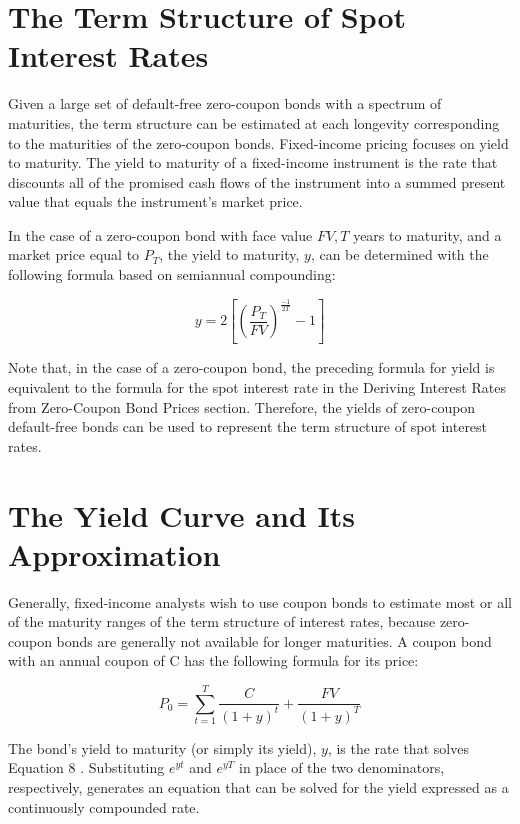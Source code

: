 \documentclass[11pt]{article}
\begin{document}
\section*{The Term Structure of Spot Interest Rates}
Given a large set of default-free zero-coupon bonds with a spectrum of maturities, the term structure can be estimated at each longevity corresponding to the maturities of the zero-coupon bonds. Fixed-income pricing focuses on yield to maturity. The yield to maturity of a fixed-income instrument is the rate that discounts all of the promised cash flows of the instrument into a summed present value that equals the instrument's market price.

In the case of a zero-coupon bond with face value $F V, T$ years to maturity, and a market price equal to $P_{T}$, the yield to maturity, $y$, can be determined with the following formula based on semiannual compounding:

$$
y=2\left[\left(\frac{P_{T}}{F V}\right)^{\frac{-1}{2 T}}-1\right]
$$

Note that, in the case of a zero-coupon bond, the preceding formula for yield is equivalent to the formula for the spot interest rate in the Deriving Interest Rates from Zero-Coupon Bond Prices section. Therefore, the yields of zero-coupon default-free bonds can be used to represent the term structure of spot interest rates.

\section*{The Yield Curve and Its Approximation}
Generally, fixed-income analysts wish to use coupon bonds to estimate most or all of the maturity ranges of the term structure of interest rates, because zero-coupon bonds are generally not available for longer maturities. A coupon bond with an annual coupon of $\mathrm{C}$ has the following formula for its price:


\begin{equation*}
P_{0}=\sum_{t=1}^{T} \frac{C}{(1+y)^{t}}+\frac{F V}{(1+y)^{T}} \tag{8}
\end{equation*}


The bond's yield to maturity (or simply its yield), $y$, is the rate that solves Equation 8 . Substituting $e^{y t}$ and $e^{y T}$ in place of the two denominators, respectively, generates an equation that can be solved for the yield expressed as a continuously compounded rate.
\end{document}
